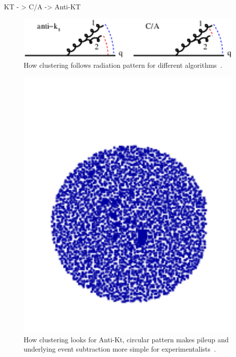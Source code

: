 KT - > C/A -> Anti-KT
\cite{Tseng:2013dva}



\begin{figure}[htb]
\centering
\includegraphics[width=1.0\textwidth]{visuals/config-antikt-double-lund.png}
\caption{How clustering follows radiation pattern for different algorithms~\cite{Dreyer:2018nbf}.}
\label{fig:lund}
\end{figure}

\begin{figure}[htb]
\centering
\includegraphics[width=1.0\textwidth]{visuals/figs_subjet-plots-antikt.png}
\caption{How clustering looks for Anti-Kt, circular pattern makes pileup and underlying event subtraction more simple for experimentalists~\cite{Dreyer:2018nbf}.}
\label{fig:lund}
\end{figure}

